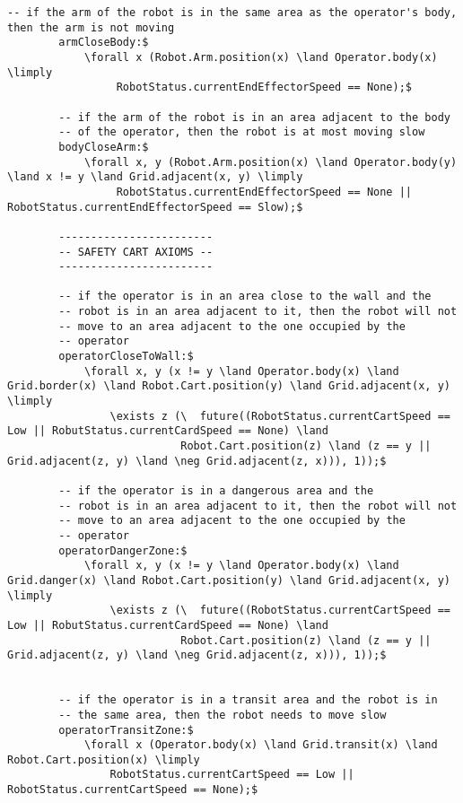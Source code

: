 \begin{lstlisting}[fontadjust, mathescape, frame=single]
        -- if the arm of the robot is in the same area as the operator's body, then the arm is not moving
        armCloseBody:$
            \forall x (Robot.Arm.position(x) \land Operator.body(x) \limply
                 RobotStatus.currentEndEffectorSpeed == None);$

        -- if the arm of the robot is in an area adjacent to the body
        -- of the operator, then the robot is at most moving slow
        bodyCloseArm:$
            \forall x, y (Robot.Arm.position(x) \land Operator.body(y) \land x != y \land Grid.adjacent(x, y) \limply
                 RobotStatus.currentEndEffectorSpeed == None || RobotStatus.currentEndEffectorSpeed == Slow);$

        ------------------------       
        -- SAFETY CART AXIOMS --
        ------------------------

        -- if the operator is in an area close to the wall and the
        -- robot is in an area adjacent to it, then the robot will not
        -- move to an area adjacent to the one occupied by the
        -- operator
        operatorCloseToWall:$
            \forall x, y (x != y \land Operator.body(x) \land Grid.border(x) \land Robot.Cart.position(y) \land Grid.adjacent(x, y) \limply
                \exists z (\  future((RobotStatus.currentCartSpeed == Low || RobutStatus.currentCardSpeed == None) \land
                           Robot.Cart.position(z) \land (z == y || Grid.adjacent(z, y) \land \neg Grid.adjacent(z, x))), 1));$

        -- if the operator is in a dangerous area and the
        -- robot is in an area adjacent to it, then the robot will not
        -- move to an area adjacent to the one occupied by the
        -- operator
        operatorDangerZone:$
            \forall x, y (x != y \land Operator.body(x) \land Grid.danger(x) \land Robot.Cart.position(y) \land Grid.adjacent(x, y) \limply
                \exists z (\  future((RobotStatus.currentCartSpeed == Low || RobutStatus.currentCardSpeed == None) \land
                           Robot.Cart.position(z) \land (z == y || Grid.adjacent(z, y) \land \neg Grid.adjacent(z, x))), 1));$


        -- if the operator is in a transit area and the robot is in
        -- the same area, then the robot needs to move slow
        operatorTransitZone:$
            \forall x (Operator.body(x) \land Grid.transit(x) \land Robot.Cart.position(x) \limply
                RobotStatus.currentCartSpeed == Low || RobotStatus.currentCartSpeed == None);$
                \end{lstlisting}